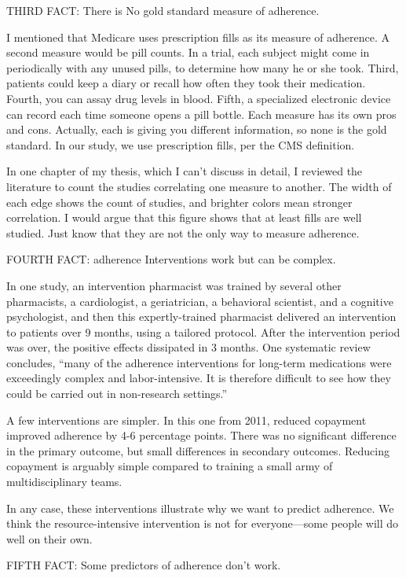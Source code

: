 \documentclass[12pt]{report}
\begin{document}
\begin{large}
THIRD FACT: There is No gold standard measure of adherence.

I mentioned that Medicare uses prescription fills as its measure of
adherence. A second measure would be pill counts. In a trial, each
subject might come in periodically with any unused pills, to determine
how many he or she took. Third, patients could keep a diary or recall
how often they took their medication. Fourth, you can assay drug
levels in blood. Fifth, a specialized electronic device can record
each time someone opens a pill bottle. Each measure has its own pros
and cons. Actually, each is giving you different information, so none
is the gold standard. In our study, we use prescription fills, per the
CMS definition.

In one chapter of my thesis, which I can't discuss in detail, I
reviewed the literature to count the studies correlating one measure
to another. The width of each edge shows the count of studies, and
brighter colors mean stronger correlation. I would argue that this
figure shows that at least fills are well studied. Just know that they
are not the only way to measure adherence.

FOURTH FACT: adherence Interventions work but can be complex.

In one study, an intervention pharmacist was trained by several other
pharmacists, a cardiologist, a geriatrician, a behavioral scientist,
and a cognitive psychologist, and then this expertly-trained
pharmacist delivered an intervention to patients over 9 months, using
a tailored protocol. After the intervention period was over, the
positive effects dissipated in 3 months. One systematic review
concludes, ``many of the adherence interventions for long-term
medications were exceedingly complex and labor-intensive. It is
therefore difficult to see how they could be carried out in
non-research settings.''

A few interventions are simpler. In this one from 2011, reduced copayment
improved adherence by 4-6 percentage points. There was no significant
difference in the primary outcome, but small differences in secondary
outcomes. Reducing copayment is arguably simple compared to training a
small army of multidisciplinary teams.

In any case, these interventions illustrate why we want to predict
adherence. We think the resource-intensive intervention is not for
everyone---some people will do well on their own.

FIFTH FACT: Some predictors of adherence don't work.


\end{large}
\end{document}

